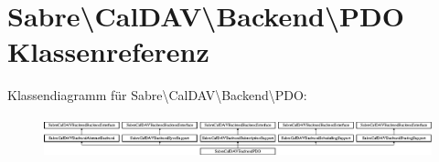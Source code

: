 \hypertarget{class_sabre_1_1_cal_d_a_v_1_1_backend_1_1_p_d_o}{}\section{Sabre\textbackslash{}Cal\+D\+AV\textbackslash{}Backend\textbackslash{}P\+DO Klassenreferenz}
\label{class_sabre_1_1_cal_d_a_v_1_1_backend_1_1_p_d_o}
Klassendiagramm für Sabre\textbackslash{}Cal\+D\+AV\textbackslash{}Backend\textbackslash{}P\+DO\+:\begin{figure}[H]
\begin{center}
\leavevmode
\includegraphics[height=1.221818cm]{class_sabre_1_1_cal_d_a_v_1_1_backend_1_1_p_d_o}
\end{center}
\end{figure}
